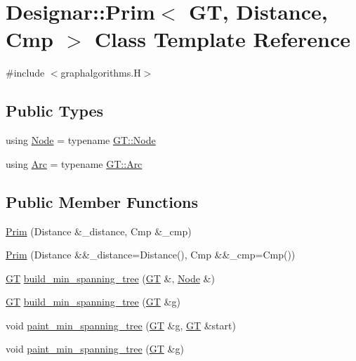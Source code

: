 \hypertarget{class_designar_1_1_prim}{}\section{Designar\+:\+:Prim$<$ GT, Distance, Cmp $>$ Class Template Reference}
\label{class_designar_1_1_prim}


{\ttfamily \#include $<$graphalgorithms.\+H$>$}

\subsection*{Public Types}
\begin{DoxyCompactItemize}
\item 
using \hyperlink{class_designar_1_1_prim_a61fb55303a5350e0a6dadd5472571ba6}{Node} = typename \hyperlink{class_designar_1_1_graph_a5dfc7dba9d092ac489c72e40390c37d0}{G\+T\+::\+Node}
\item 
using \hyperlink{class_designar_1_1_prim_adb1cb5cb91efc05d2a06b5e0825ed609}{Arc} = typename \hyperlink{class_designar_1_1_graph_a74c730ef4ce2d20f998d72bd25c2b5bf}{G\+T\+::\+Arc}
\end{DoxyCompactItemize}
\subsection*{Public Member Functions}
\begin{DoxyCompactItemize}
\item 
\hyperlink{class_designar_1_1_prim_a72499b6f863776f135b39977e8c981bf}{Prim} (Distance \&\+\_\+distance, Cmp \&\+\_\+cmp)
\item 
\hyperlink{class_designar_1_1_prim_abf866c064ed21f9be1ccb60ed9df84c1}{Prim} (Distance \&\&\+\_\+distance=Distance(), Cmp \&\&\+\_\+cmp=Cmp())
\item 
\hyperlink{demo-buildgraph_8_c_a3001c40d2c31ca87ed96cd7d1334a55e}{GT} \hyperlink{class_designar_1_1_prim_a39e561f33cf1a98dc599d81f01948a16}{build\+\_\+min\+\_\+spanning\+\_\+tree} (\hyperlink{demo-buildgraph_8_c_a3001c40d2c31ca87ed96cd7d1334a55e}{GT} \&, \hyperlink{class_designar_1_1_prim_a61fb55303a5350e0a6dadd5472571ba6}{Node} \&)
\item 
\hyperlink{demo-buildgraph_8_c_a3001c40d2c31ca87ed96cd7d1334a55e}{GT} \hyperlink{class_designar_1_1_prim_a57b6f5db0d64fc287fc6beb5ffb3713d}{build\+\_\+min\+\_\+spanning\+\_\+tree} (\hyperlink{demo-buildgraph_8_c_a3001c40d2c31ca87ed96cd7d1334a55e}{GT} \&g)
\item 
void \hyperlink{class_designar_1_1_prim_ad2f2b01a9c586af106f28906e23bbd30}{paint\+\_\+min\+\_\+spanning\+\_\+tree} (\hyperlink{demo-buildgraph_8_c_a3001c40d2c31ca87ed96cd7d1334a55e}{GT} \&g, \hyperlink{demo-buildgraph_8_c_a3001c40d2c31ca87ed96cd7d1334a55e}{GT} \&start)
\item 
void \hyperlink{class_designar_1_1_prim_a34cd263d3ccef0be04a710bde8d6aa68}{paint\+\_\+min\+\_\+spanning\+\_\+tree} (\hyperlink{demo-buildgraph_8_c_a3001c40d2c31ca87ed96cd7d1334a55e}{GT} \&g)
\end{DoxyCompactItemize}



